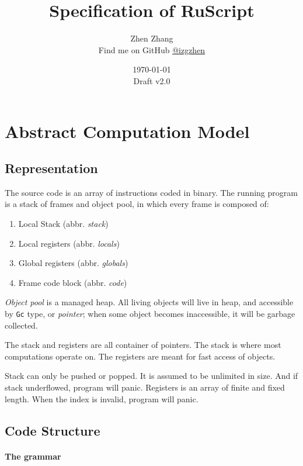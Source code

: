 \documentclass[]{article}
\title{Specification of RuScript}
\date{\today \\ Draft v2.0}
\author{Zhen Zhang \\ Find me on GitHub \href{https://github.com/izgzhen}{@izgzhen}}
\numberwithin{equation}{section}
\numberwithin{figure}{section}
\numberwithin{table}{section}
\begin{document}
\maketitle

\newpage

\tableofcontents

\newpage

\section{Abstract Computation Model}\label{abstract-computation-model}

\subsection{Representation}\label{representation}

The source code is an array of instructions coded in binary. The running
program is a stack of frames and object pool, in which every frame is
composed of:

\begin{enumerate}
\def\labelenumi{\arabic{enumi}.}
\itemsep1pt\parskip0pt
\item
  Local Stack (abbr. \emph{stack})
\item
  Local registers (abbr. \emph{locals})
\item
  Global registers (abbr. \emph{globals})
\item
  Frame code block (abbr. \emph{code})
\end{enumerate}

\emph{Object pool} is a managed heap. All living objects will live in
heap, and accessible by \texttt{Gc} type, or \emph{pointer}; when some
object becomes inaccessible, it will be garbage collected.

The stack and registers are all container of pointers. The stack is
where most computations operate on. The registers are meant for fast access of objects.

Stack can only be pushed or popped. It is assumed to
be unlimited in size. And if stack underflowed, program will
panic. Registers is an array of finite and fixed length. When the index is
invalid, program will panic.

\subsection{Code Structure}\label{code-structure}

\paragraph{The grammar}\label{the-grammar}
\end{document}
